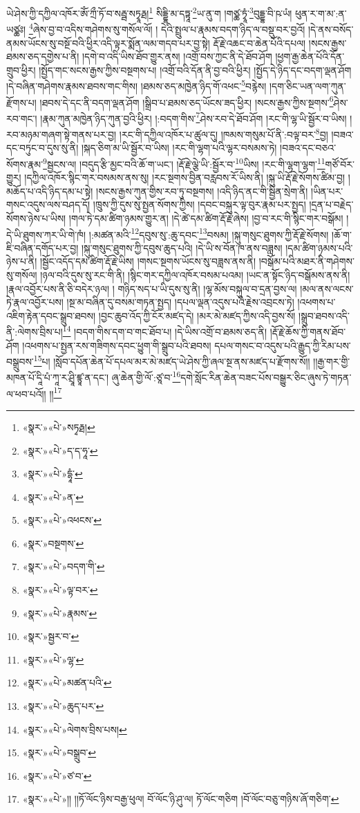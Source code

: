 ཡེ་ཤེས་ཀྱི་དཀྱིལ་འཁོར་ཨོཾ་ཀྲྀ་ཏོ་བ་སརྦྦ་སཏྭཱརྠ།\footnote{«སྣར་»«པེ་»སཏྭརྠ།} སིདྡྷི་མ་དཏྟཱ་\footnote{«སྣར་»«པེ་»ད་ད་ཧཱ་}ཡ་ནུ་ག །གཙྪ་ཏྭཱཾ་\footnote{«སྣར་»«པེ་»དྷཱཾ་}བུདྡྷ་བི་ཥ་ཡཾ། ཕུན་ར་ག་མ་:ན་ཡཙྪཿ། \footnote{«སྣར་»«པེ་»ན་}ཞེས་བྱ་བ་འདིས་གཤེགས་སུ་གསོལ་ལོ། །
དེའི་སྤྲུལ་པ་རྣམས་བདག་ཉིད་ལ་བསྡུ་བར་བྱའོ། །དེ་ནས་བསོད་ནམས་ཡོངས་སུ་བསྔོ་བའི་ཕྱིར་འདི་ལྟར་སྨོན་ལམ་གདབ་པར་བྱ་སྟེ། རྡོ་རྗེ་འཆང་བ་ཆེན་པོའི་དཔལ། །སངས་རྒྱས་ཐམས་ཅད་དགྱེས་པ་ནི། །དགེ་བ་འདི་ཡིས་ཐོབ་གྱུར་ནས། །འགྲོ་བས་ཀྱང་ནི་དེ་ཐོབ་ཤོག །ཕྱག་རྒྱ་ཆེན་པོའི་དོན་གྲུབ་ཕྱིར། །སྤྱོད་གང་སངས་རྒྱས་ཀྱིས་བསྔགས་པ། །འགྲོ་བའི་དོན་ནི་བྱ་བའི་ཕྱིར། །སྤྱོད་དེ་ཉིད་དང་བདག་ལྡན་ཤོག །དེ་བཞིན་གཤེགས་རྣམས་ཐབས་གང་གིས། །ཐམས་ཅད་མཁྱེན་ཉིད་གོ་འཕང་\footnote{«སྣར་»«པེ་»འཕངས་}བརྙེས། །དག་ཅིང་ཡན་ལག་ཀུན་རྫོགས་པ། །ཐབས་དེ་དང་ནི་བདག་ལྡན་ཤོག །སྒྲིབ་པ་ཐམས་ཅད་ཡོངས་ཟད་ཕྱིར། །སངས་རྒྱས་ཀྱིས་སྔགས་\footnote{«སྣར་»བསྔགས་}ཤེས་རབ་གང་། །རྣམ་ཀུན་མཁྱེན་ཉིད་ཀུན་བྱའི་ཕྱིར། །:བདག་གིས་\footnote{«སྣར་»«པེ་»བདག་གི་}ཤེས་རབ་དེ་ཐོབ་ཤོག །རང་གི་ལྷ་ཡི་སྦྱོར་བ་ཡིས། །རབ་མཉམ་གཞག་སྟེ་གནས་པར་བྱ། །རང་གི་དཀྱིལ་འཁོར་པ་ཚུལ་དུ། །ཁམས་གསུམ་པོ་ནི་:བལྟ་བར་\footnote{«སྣར་»«པེ་»ལྟ་བར་}བྱ། །བཟའ་དང་བཏུང་བ་དུས་སུ་ནི། །སྐད་ཅིག་མ་ཡི་སྦྱོར་བ་ཡིས། །རང་གི་ལྷག་པའི་ལྷར་བསམས་ཏེ། །བཟའ་དང་བཅའ་སོགས་རྣམ་\footnote{«སྣར་»«པེ་»རྣམས་}སྦྱངས་ལ། །བདུད་རྩི་མྱང་བའི་ཆོ་ག་ཡང་། །རྡོ་རྗེ་ལྕེ་ཡི་:སྦྱོར་བ་\footnote{«སྣར་»སྦྱར་བ་}ཡིས། །རང་གི་ལྷག་ལྷག་\footnote{«སྣར་»«པེ་»ལྷ་}གཙོ་བོར་གྱུར། །དཀྱིལ་འཁོར་སྙིང་གར་བསམས་ནས་སུ། །རང་སྔགས་བྱིན་བརླབས་རོ་ཡིས་ནི། །སྐུ་ཡི་རྡོ་རྗེ་སོགས་ཚིམ་བྱ། །མཆོད་པ་འདི་ཉིད་དམ་པ་སྟེ། །སངས་རྒྱས་ཀུན་གྱིས་རབ་ཏུ་བསྔགས། །འདི་ཉིད་ནང་གི་སྦྱིན་སྲེག་ནི། །ཡིན་པར་གསང་འདུས་ལས་བཤད་དོ། །ཁྲུས་ཀྱི་དུས་སུ་སྤྱན་སོགས་ཀྱིས། །དབང་བསྐུར་ལྟ་བུར་རྣམ་པར་སྤྱད། །དྲན་པ་བརྗེད་སོགས་ཉེས་པ་ཡིས། །གལ་ཏེ་དམ་ཚིག་ཉམས་གྱུར་ན། །དེ་ཚེ་དམ་ཚིག་རྡོ་རྗེ་ཞེས། །བྱ་བ་རང་གི་སྙིང་གར་བསྒོམ། །དེ་ཡི་ཐུགས་ཀར་ཡི་གེ་ཁཾ། །:མཚན་མའི་\footnote{«སྣར་»«པེ་»མཚན་པའི་}དབུས་སུ་:ཆུ་དབང་\footnote{«སྣར་»«པེ་»ཆུད་པར་}བསམ། །སྐུ་གསུང་ཐུགས་ཀྱི་རྡོ་རྗེ་སོགས། །ཆོ་ག་ཇི་བཞིན་དགོད་པར་བྱ། །སྐུ་གསུང་ཐུགས་ཀྱི་དབུས་ཆུད་པའི། །དེ་ཡི་ས་བོན་ཁ་ནས་བཟླས། །དམ་ཚིག་ཉམས་པའི་ཉེས་པ་ནི། །སྦྱོང་འདོད་དམ་ཚིག་རྡོ་རྗེ་ཡིས། །གསང་སྔགས་ཡོངས་སུ་བཟླས་ནས་ནི། །བསྒོམ་པའི་མཐར་ནི་གཤེགས་སུ་གསོལ། །ཉལ་བའི་དུས་སུ་རང་གི་ནི། །སྙིང་གར་དཀྱིལ་འཁོར་བསམ་པའམ། །ཡང་ན་སྟོང་ཉིད་བསྒོམས་ནས་ནི། །རྣལ་འབྱོར་པས་ནི་ཅི་བདེར་ཉལ། །
གཉིད་སད་པ་ཡི་དུས་སུ་ནི། །ལྷ་མོས་བསྐུལ་བ་དྲན་བྱས་ལ། །མལ་ནས་ལངས་ཏེ་རྣལ་འབྱོར་པས། །སྔ་མ་བཞིན་དུ་བསམ་གཏན་སྤྱད། །དཔལ་ལྡན་འདུས་པའི་རྗེས་འབྲངས་ཏེ། །འཕགས་པ་འཇིག་རྟེན་དབང་སྒྲུབ་ཐབས། །བྱང་ཆུབ་འོད་ཀྱི་ངོར་མཛད་དེ། །མར་མེ་མཛད་ཀྱིས་འདི་བྱས་སོ། །སྒྲུབ་ཐབས་འདི་ནི་:ལེགས་བྲིས་པ།\footnote{«སྣར་»«པེ་»ལེགས་བྲིས་པས།} །བདག་གིས་དག་བ་གང་ཐོབ་པ། །དེ་ཡིས་འགྲོ་བ་ཐམས་ཅད་ནི། །རྡོ་རྗེ་ཆོས་ཀྱི་གནས་ཐོབ་ཤོག །འཕགས་པ་སྤྱན་རས་གཟིགས་དབང་ཕྱུག་གི་སྒྲུབ་པའི་ཐབས། དཔལ་གསང་བ་འདུས་པའི་རྒྱུད་ཀྱི་རིམ་པས་བསྒྲུབས་\footnote{«སྣར་»«པེ་»བསྒྲུབ་}པ། །སློབ་དཔོན་ཆེན་པོ་དཔལ་མར་མེ་མཛད་ཡེ་ཤེས་ཀྱི་ཞལ་སྔ་ནས་མཛད་པ་རྫོགས་སོ།། །།རྒྱ་གར་གྱི་མཁན་པོ་དཱི་པཾ་ཀཱ་ར་ཤྲཱི་ཛྙཱ་ན་དང་། ཞུ་ཆེན་གྱི་ལོ་:ཙཱ་བ་\footnote{«སྣར་»«པེ་»ཙ་བ་}དགེ་སློང་རིན་ཆེན་བཟང་པོས་བསྒྱུར་ཅིང་ཞུས་ཏེ་གཏན་ལ་ཕབ་པའོ།། །།\footnote{«སྣར་»«པེ་»།། །།ཏོ་ལོང་ཉིས་བརྒྱ་ཕུལ། བོ་ལོང་ཉི་ཤུ་ལ། ཏོ་ལོང་གཅིག །བོ་ལོང་བཅུ་གཉིས་ཞོ་གཅིག་}